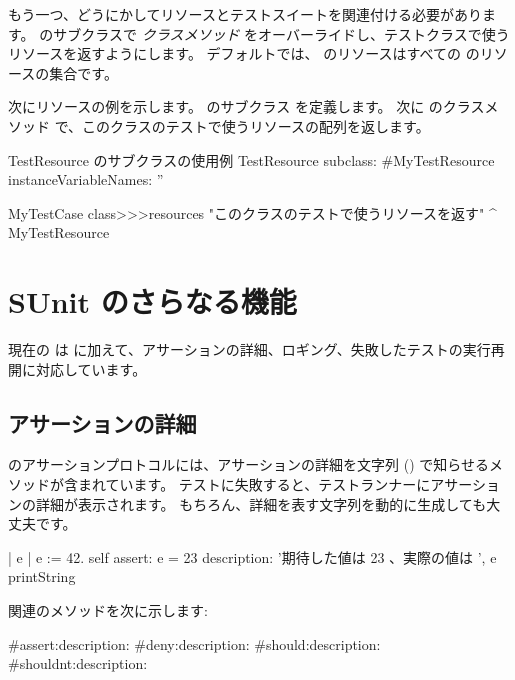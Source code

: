 \documentclass[a4paper,10pt,twoside]{book}
\begin{document}
もう一つ、どうにかしてリソースとテストスイートを関連付ける必要があります。
 のサブクラスで  \emph{クラスメソッド} をオーバーライドし、テストクラスで使うリソースを返すようにします。
\ab{}
デフォルトでは、  のリソースはすべての  のリソースの集合です。

次にリソースの例を示します。
 のサブクラス  を定義します。
次に  のクラスメソッド  で、このクラスのテストで使うリソースの配列を返します。

\begin{classdef}[mytestresource]{TestResource のサブクラスの使用例}
TestResource subclass: #MyTestResource
	instanceVariableNames: ''

MyTestCase class>>>resources
	"このクラスのテストで使うリソースを返す"
	^{ MyTestResource }
\end{classdef}

\section{SUnit のさらなる機能}

現在の \sunit は  に加えて、アサーションの詳細、ロギング、失敗したテストの実行再開に対応しています。

\subsection{アサーションの詳細}

 のアサーションプロトコルには、アサーションの詳細を文字列 () で知らせるメソッドが含まれています。
テストに失敗すると、テストランナーにアサーションの詳細が表示されます。
もちろん、詳細を表す文字列を動的に生成しても大丈夫です。

\begin{code}{}
| e |
e := 42.
self assert: e = 23
	description: '期待した値は 23 、実際の値は ', e printString
\end{code}

 関連のメソッドを次に示します:
\begin{code}{}
#assert:description:
#deny:description:
#should:description:
#shouldnt:description:
\end{code}
\end{document}
